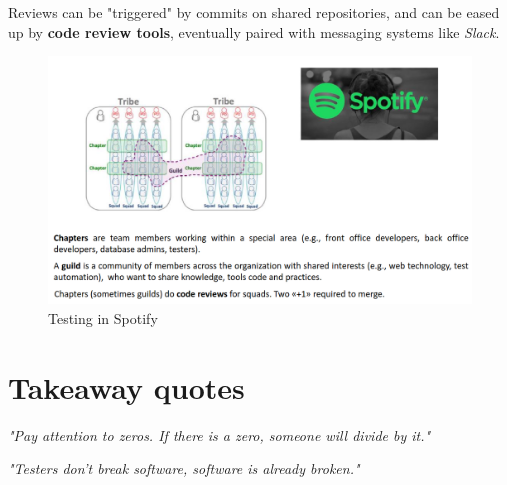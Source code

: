 Reviews can be "triggered" by commits on shared repositories, and can be eased up by
\textbf{code review tools}, eventually paired with messaging systems like \textit{Slack}.

\begin{figure}[htbp]
   \centering
   \includegraphics{images/testing_spotify.png}
   \caption{Testing in Spotify}
   \label{fig:testing_spotify}
\end{figure}
\section{Takeaway quotes}
\begin{center}
   \textit{"Pay attention to zeros. If there is a zero, someone will divide by it."}

   \textit{"Testers don’t break software, software is already broken."}
\end{center}